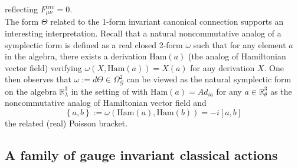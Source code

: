 \documentclass[a4paper,11pt,twoside]{article}
\numberwithin{equation}{section}
\newcommand\ham{{\text{Ham}}}
\theoremstyle{nonumberplain}
\newcounter{and}
\begin{document}
%
reflecting $F^{inv}_{\mu\nu}=0$. \\ 
The form $\Theta$ related to the 1-form invariant canonical connection supports an interesting interpretation. Recall \cite{mdv88-99} that a natural noncommutative analog of a symplectic form is defined as a real closed 2-form $\omega$ such that for any element $a$ in the algebra, there exists a derivation $\ham(a)$ (the analog of Hamiltonian vector field) verifying $\omega(X,\ham(a))=X(a)$ for any derivation $X$. One then observes that $\omega:=d\Theta\in\Omega^2_\mathcal{G}$ can be viewed as the natural symplectic form on the algebra $\mathbb{R}^3_\lambda$ in the setting of \cite{mdv88-99} with $\ham(a)=Ad_{ia}$ for any $a\in\mathbb{R}^3_\theta$ as the noncommutative analog of Hamiltonian vector field and 
\begin{equation}
\left\{a,b\right\}:=\omega\left(\ham(a),\ham(b)\right)=-i\left[a,b\right]\label{poissonB}
\end{equation}
the related (real) Poisson bracket.\par

\subsection{A family of gauge invariant classical actions}
\end{document}
